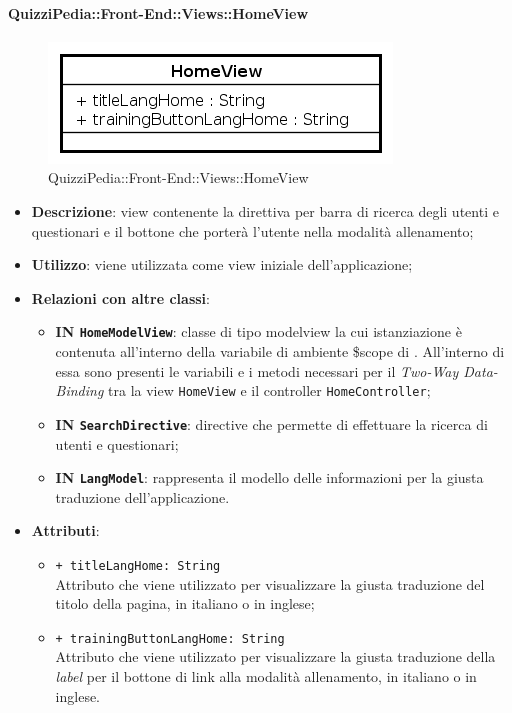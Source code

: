 \paragraph{QuizziPedia::Front-End::Views::HomeView}

\label{QuizziPedia::Front-End::View::HomeView}
\begin{figure} [ht]
	\centering
	\includegraphics[scale=0.80]{UML/Classi/Front-End/QuizziPedia_Front-end_Views_HomeView.png}
	\caption{QuizziPedia::Front-End::Views::HomeView}
\end{figure} \FloatBarrier
\begin{itemize}
	\item \textbf{Descrizione}: view contenente la direttiva per barra di ricerca degli utenti e questionari e il bottone che porterà l'utente nella modalità allenamento;
	\item \textbf{Utilizzo}: viene utilizzata come view iniziale dell'applicazione;
	\item \textbf{Relazioni con altre classi}:
	\begin{itemize}
		\item \textbf{IN \texttt{HomeModelView}}: classe di tipo modelview la cui istanziazione è contenuta all'interno della variabile di ambiente \$scope di . All'interno di essa sono presenti le variabili e i metodi necessari per il \textit{Two-Way Data-Binding} tra la view \texttt{HomeView} e il controller \texttt{HomeController};
		\item \textbf{IN \texttt{SearchDirective}}: directive che permette di effettuare la ricerca di utenti e questionari;
		\item \textbf{IN \texttt{LangModel}}: rappresenta il modello delle informazioni per la giusta traduzione dell'applicazione.
	\end{itemize}
	\item \textbf{Attributi}:
	\begin{itemize}
		\item \texttt{+ titleLangHome: String} \\ Attributo che viene utilizzato per visualizzare la giusta traduzione del titolo della pagina, in italiano o in inglese;
		\item \texttt{+ trainingButtonLangHome: String} \\ Attributo che viene utilizzato per visualizzare la giusta traduzione della \textit{label} per il bottone di link alla modalità allenamento, in italiano o in inglese.
	\end{itemize}
\end{itemize}
	